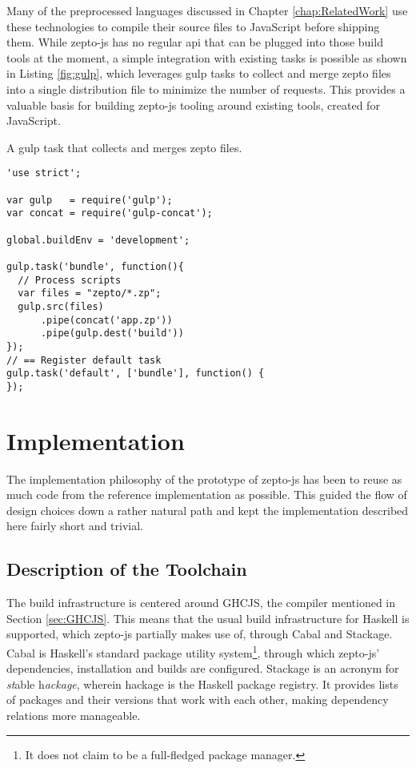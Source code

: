 \documentclass[oneside,11pt,xetex]{scrbook}
\begin{document}
Many of the preprocessed languages discussed in Chapter \ref{chap:RelatedWork} use these
technologies to compile their source files to JavaScript before shipping them.
While zepto-js has no regular \gls{api} that can be plugged into those build tools
at the moment, a simple integration with existing tasks is possible as shown in
Listing \ref{fig:gulp}, which leverages gulp tasks to collect and merge zepto
files into a single distribution file to minimize the number of requests.
This provides a valuable basis for building zepto-js tooling around existing
tools, created for JavaScript.

\begin{listing}[H]
\caption{A gulp task that collects and merges zepto files.}
\begin{verbatim}
'use strict';

var gulp   = require('gulp');
var concat = require('gulp-concat');

global.buildEnv = 'development';

gulp.task('bundle', function(){
  // Process scripts
  var files = "zepto/*.zp";
  gulp.src(files)
      .pipe(concat('app.zp'))
      .pipe(gulp.dest('build'))
});
// == Register default task
gulp.task('default', ['bundle'], function() {
});
\end{verbatim}
\label{fig:gulp}
\end{listing}

\chapter{Implementation}
\label{chap:Implementation}

The implementation philosophy of the prototype of zepto-js has been to reuse as much
code from the reference implementation as possible. This guided the flow of design choices
down a rather natural path and kept the implementation described here fairly short and trivial.

\section{Description of the Toolchain}

The build infrastructure is centered around GHCJS, the compiler mentioned in Section \ref{sec:GHCJS}.
This means that the usual build infrastructure for Haskell is supported, which zepto-js partially
makes use of, through Cabal and Stackage. Cabal is Haskell's standard package utility
system\footnote{It does not claim to be a full-fledged package manager.}, through which
zepto-js' dependencies, installation and builds are configured. Stackage is an acronym
for \textit{st}able h\textit{ackage}, wherein hackage is the Haskell package registry.
It provides lists of packages and their versions that work with each other, making
dependency relations more manageable.
\end{document}

